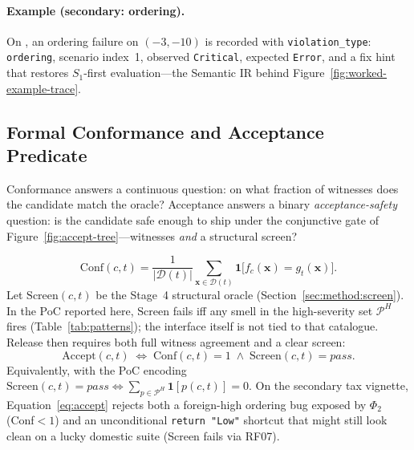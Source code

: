 \paragraph{Example (secondary: ordering).}
On , an ordering failure on $(-3,-10)$ is recorded with
\texttt{violation\_type}: \texttt{ordering}, scenario index~1, observed
\texttt{Critical}, expected \texttt{Error}, and a fix hint that restores
$S_1$-first evaluation---the Semantic IR behind
Figure~\ref{fig:worked-example-trace}.

\subsection{Formal Conformance and Acceptance Predicate}
\label{subsec:conformance-acceptance}

Conformance answers a continuous question: on what fraction of witnesses does
the candidate match the oracle?
Acceptance answers a binary \emph{acceptance-safety} question: is the
candidate safe enough to ship under the conjunctive gate of
Figure~\ref{fig:accept-tree}---witnesses \emph{and} a structural screen?

\begin{equation}
  \label{eq:conformance}
  \mathrm{Conf}(c,t) = \frac{1}{|\mathcal{D}(t)|} \sum_{\mathbf{x} \in \mathcal{D}(t)}
  \mathbf{1}\bigl[f_c(\mathbf{x}) = g_t(\mathbf{x})\bigr].
\end{equation}
Let $\mathrm{Screen}(c,t)$ be the Stage~4 structural oracle
(Section~\ref{sec:method:screen}).
In the PoC reported here, $\mathrm{Screen}$ fails iff any smell in the
high-severity set $\mathcal{P}^H$ fires (Table~\ref{tab:patterns}); the
interface itself is not tied to that catalogue.
Release then requires both full witness agreement and a clear screen:
\begin{equation}
  \label{eq:accept}
  \mathrm{Accept}(c,t) \;\iff\;
  \mathrm{Conf}(c,t) = 1 \;\land\;
  \mathrm{Screen}(c,t) = \mathit{pass}.
\end{equation}
Equivalently, with the PoC encoding
$\mathrm{Screen}(c,t)=\mathit{pass} \iff
\sum_{p \in \mathcal{P}^H} \mathbf{1}[p(c,t)] = 0$.
On the secondary tax vignette, Equation~\eqref{eq:accept} rejects both a
foreign-high ordering bug exposed by $\Phi_2$ (Conf${<}1$) and an
unconditional \texttt{return "Low"} shortcut that might still look clean on
a lucky domestic suite (Screen fails via RF07).

